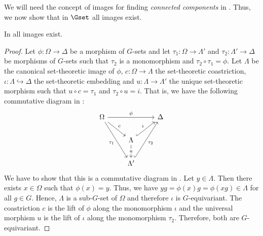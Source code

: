 We will need the concept of images for finding \emph{connected components} in . Thus, we now show that in $\Gset$ all images exist.

\begin{prop}[Images]\label{prop:images_in_G_sets}
In \Gset{} all images exist.
\end{prop}
\begin{proof}
Let $\phi\colon \Omega \to \Delta$ be a morphism of $G$-sets and let $\tau_1\colon \Omega \to \Lambda'$ and $\tau_2\colon \Lambda' \to \Delta$ be morphisms of $G$-sets such that $\tau_2$ is a monomorphism and $\tau_2 \circ \tau_1 = \phi$. Let $\Lambda$ be the canonical set-theoretic image of $\phi$, $c\colon \Omega \to \Lambda$ the set-theoretic coastriction, $\iota \colon \Lambda \hookrightarrow \Delta$ the set-theoretic embedding and $u\colon \Lambda \to \Lambda'$ the unique set-theoretic morphism such that $u \circ c = \tau_1$ and $\tau_2 \circ u = i$. That is, we have the following commutative diagram in \Set{}:
\[
\begin{tikzcd}
\Omega \arrow[rr, "\phi"] \arrow[rd, "c"] \arrow[rdd, "\tau_1"'] &                                                               & \Delta \\
                                                                 & \Lambda \arrow[ru, "\iota", hook] \arrow[d, "u" description]  &        \\
                                                                 & \Lambda' \arrow[ruu, "\tau_2"', hook]                         &  
\end{tikzcd}
\]
We have to show that this is a commutative diagram in \Gset{}. Let $y \in \Lambda$. Then there exists $x \in \Omega$ such that $\phi(x) = y$. Thus, we have $yg = \phi(x)g = \phi(xg) \in \Lambda$ for all $g \in G$. Hence, $\Lambda$ is a sub-$G$-set of $\Omega$ and therefore $\iota$ is $G$-equivariant. The coastriction $c$ is the lift of $\phi$ along the monomorphism $\iota$ and the universal morphism $u$ is the lift of $\iota$ along the monomorphism $\tau_2$. Therefore, both are $G$-equivariant.
\end{proof}

